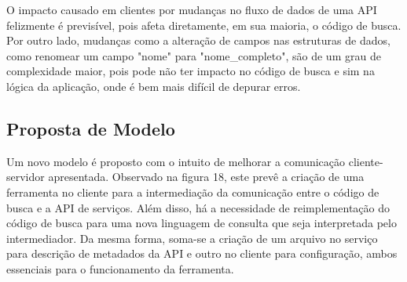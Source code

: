 \documentclass[12pt]{article}
\begin{document}
  O impacto causado em clientes por mudanças no fluxo de dados de uma API felizmente é previsível, pois afeta diretamente, em sua maioria, o código de busca. Por outro lado, mudanças como a alteração de campos nas estruturas de dados, como renomear um campo "nome" para "nome\_completo", são de um grau de complexidade maior, pois pode não ter impacto no código de busca e sim na lógica da aplicação, onde é bem mais difícil de depurar erros.

  \subsection{Proposta de Modelo}

  Um novo modelo é proposto com o intuito de melhorar a comunicação cliente-servidor apresentada. Observado na figura 18, este prevê a criação de uma ferramenta no cliente para a intermediação da comunicação entre o código de busca e a API de serviços. Além disso, há a necessidade de reimplementação do código de busca para uma nova linguagem de consulta que seja interpretada pelo intermediador. Da mesma forma, soma-se a criação de um arquivo no serviço para descrição de metadados da API e outro no cliente para configuração, ambos essenciais para o funcionamento da ferramenta.
\end{document}
